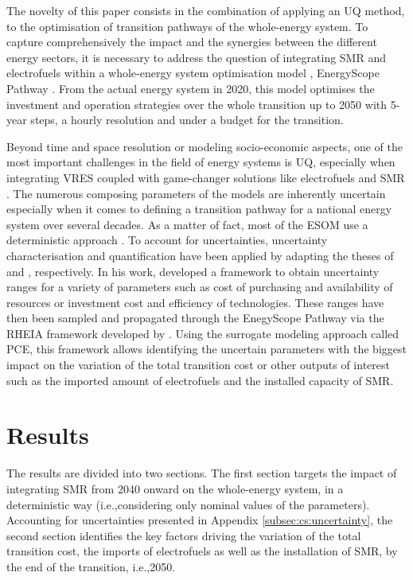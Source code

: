 \documentclass[11pt,twoside,a4paper,english]{article}
\def\ie{i.e.,}
\begin{document}
The novelty of this paper consists in the combination of applying an \gls{UQ} method, to the optimisation of transition pathways of the whole-energy system. To capture comprehensively the impact and the synergies between the different energy sectors, it is necessary to address the question of integrating \gls{SMR} and electrofuels within a whole-energy system optimisation model \cite{contino2020whole}, EnergyScope Pathway \cite{limpens2024pathway}. From the actual energy system in 2020, this model optimises the investment and operation strategies over the whole transition up to 2050 with 5-year steps,  a hourly resolution and under a  budget for the transition.

Beyond time and space resolution or modeling socio-economic aspects, one of the most important challenges in the field of energy systems is \gls{UQ}, especially when integrating \gls{VRES} coupled with game-changer solutions like electrofuels and \gls{SMR} \cite{pfenninger2014energy,fodstad2022next,manco2024review}. The numerous composing parameters of the models are inherently uncertain especially when it comes to defining a transition pathway for a national energy system over several decades. As a matter of fact, most of the \gls{ESOM} use a deterministic approach \cite{yue2018review}.  To account for uncertainties, uncertainty characterisation and quantification have been applied by adapting the theses of \citet{Moret2017PhDThesis} and \citet{coppittersthesis}, respectively. In his work, \citet{Moret2017PhDThesis} developed a framework to obtain uncertainty ranges for a variety of parameters such as cost of purchasing and availability of resources or investment cost and efficiency of technologies. These ranges have then been sampled and propagated through the EnegyScope Pathway via the RHEIA framework developed by \citet{coppittersthesis}. Using the surrogate modeling approach called \gls{PCE}, this framework allows identifying the uncertain parameters with the biggest impact on the variation of the total transition cost or other outputs of interest such as the imported amount of electrofuels and the installed capacity of \gls{SMR}. 


\section{Results}
\label{sec:results}
The results are divided into two sections. The first section targets the impact of integrating \gls{SMR} from 2040 onward on the whole-energy system, in a deterministic way (\ie considering only nominal values of the parameters). Accounting for uncertainties presented in Appendix \ref{subsec:cs:uncertainty}, the second section identifies the key factors driving the variation of the total transition cost,  the imports of electrofuels as well as the installation of \gls{SMR}, by the end of the transition, \ie 2050.
\end{document}
